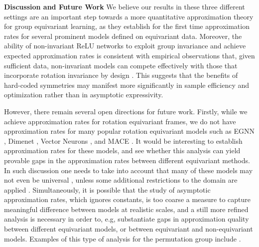 \documentclass[twoside,11pt]{article}
\begin{document}
\textbf{Discussion and Future Work}
We believe our results in these three different settings are an important step towards a more quantitative approximation theory for group equivariant learning, as they establish for the first time approximation rates for several prominent models defined on equivariant data. Moreover, the ability of non-invariant ReLU networks to exploit group invariance and achieve expected approximation rates is consistent with empirical observations that, given sufficient data, non-invariant models can compete effectively with those that incorporate rotation invariance by design \citep{aug1,aug2}. This suggests that the benefits of hard-coded symmetries may manifest more significantly in sample efficiency and optimization rather than in asymptotic expressivity.

However, there remain several open directions for future work. %
Firstly, while we achieve approximation rates for rotation equivariant frames, we do not have approximation rates for many popular rotation equivariant models such as EGNN \citep{satorras2021n}, Dimenet \citep{gasteiger2020directional}, Vector Neurons \citep{vn}, and MACE \citep{MACE}. It would be interesting to establish approximation rates for these models, and see whether this analysis can yield provable gaps in the approximation rates between different equivariant methods. In such discussion one needs to take into account that many of these  models may not even be universal \citep{Pozdnyakov_2022,li2023is}, unless some additional restrictions to the domain are applied \citep{hordan2024complete,li2025on,sverdlov2025on}.  Simultaneously, it is possible that the study of asymptotic approximation rates, which ignores constants, is too coarse a measure to capture meaningful difference between models at realistic scales, and a still more refined analysis is necessary in order to, e.g, substantiate gaps in approximation quality between different equivariant models, or between equivariant and non-equivariant models. Examples of this type of analysis for the permutation group include \cite{zweig2022exponential,zweig2023antisymmetricneuralansatzseparation}. 
\end{document}
